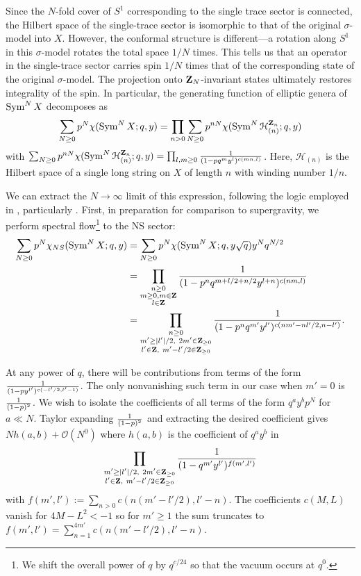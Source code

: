 \documentclass[../main.tex]{subfiles}
\begin{document}
Since the $N$-fold cover of $S^1$ corresponding to the single trace sector is connected, the Hilbert space of the single-trace sector is isomorphic to that of the original $\sigma$-model into $X$.  
However, the conformal structure is different---a rotation along $S^1$ in this $\sigma$-model rotates the total space $1/N$ times.
This tells us that an operator in the single-trace sector carries spin $1/N$ times that of the corresponding state of the original $\sigma$-model. 
The projection onto $\mathbf Z_N$-invariant states ultimately restores integrality of the spin. 
In particular, the generating function of elliptic genera of $\operatorname{Sym}^N X$ decomposes as
\begin{equation}
\sum_{N\geq 0}p^N \chi(\operatorname{Sym}^N X; q, y) = \prod_{n>0}\sum_{N \geq 0}p^{n N}\chi(\operatorname{Sym}^{N}\mathcal{H}^{\mathbf Z_n}_{(n)}; q, y)
\end{equation}
with $\sum_{N \geq 0}p^{n N}\chi(\operatorname{Sym}^{N}\mathcal{H}^{\mathbf Z_n}_{(n)}; q, y) = \prod_{l, m\geq0}{1 \over (1 - p q^m y^l)^{c(mn, l)}}$. Here, $\mathcal{H}_{(n)}$ is the Hilbert space of a single long string on $X$ of length $n$ with winding number $1/n$. 

We can extract the $N \rightarrow \infty$ limit of this expression, following the logic employed in \cite{deBoerEG, MAGOO, BKKP}, particularly \cite{BKKP}. First, in preparation for comparison to supergravity, we perform spectral flow\footnote{We shift the overall power of $q$ by $q^{c/24}$ so that the vacuum occurs at $q^0$.} to the NS sector:
\begin{align*}
\sum_{N \geq 0}p^N \chi_{NS}(\operatorname{Sym}^N X; q, y) & = \sum_{N\geq 0}p^N \chi(\operatorname{Sym}^N X; q, y \sqrt{q}) y^N q^{N/2} \\
&= \prod_{\substack{n \geq 0 \\ m \geq 0, m \in \mathbf Z \\ l \in \mathbf Z}} \frac{1}{(1 - p^n q^{m + l/2 + n/2} y^{l + n})^{c(nm,l)}} \\
&= \prod_{\substack{n \geq0 \\ m' \geq |l'|/2, \ 2 m' \in \mathbf Z_{\geq 0} \\ l' \in \mathbf Z, \ m' - l'/2 \in \mathbf Z_{\geq 0}}} \frac{1}{(1 - p^n q^{m'} y^{l'})^{c(nm' - nl'/2,n-l')}}.
\end{align*}

At any power of $q$, there will be contributions from terms of the form ${1 \over (1 - p y^{l'})^{c(-l'/2, l'-1)}}$. The only nonvanishing such term in our case when $m'=0$ is ${1 \over (1 - p)^2}$. We wish to isolate the coefficients of all terms of the form $q^a y^b p^N$ for $a \ll N$. Taylor expanding ${1 \over (1-p)^2}$ and extracting the desired coefficient gives $N h(a, b) + \mathcal{O}(N^0)$ where $h(a, b)$ is the coefficient of $q^a y^b$ in
\begin{equation}\nonumber
\prod_{\substack{m' \geq |l'|/2, \ 2 m' \in \mathbf Z_{\geq 0} \\ l' \in \mathbf Z, \  m' - l'/2 \in \mathbf Z_{\geq 0}}}{1 \over (1 - q^{m'} y^{l'})^{f(m', l')}}
\end{equation}with $f(m', l'):= \sum_{n >0}c(n(m' -  l'/2), l' - n)$.  The coefficients $c(M, L)$ vanish for $4M-L^2 < -1$ so for $m' \geq 1$ the sum truncates to $f(m', l') = \sum_{n=1}^{4m'}c(n(m' -  l'/2), l' - n)$.
\end{document}
